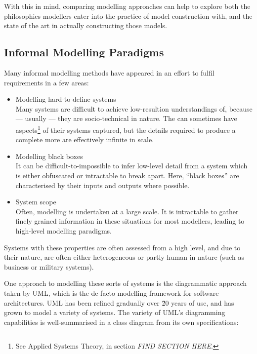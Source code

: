 \documentclass[draft]{report}
\begin{document}
With this in mind, comparing modelling approaches can help to explore both the
philosophies modellers enter into the practice of model construction with, and
the state of the art in actually constructing those models.\par


\subsection{Informal Modelling Paradigms}
\label{subsec:informal_model_lit}
Many informal modelling methods have appeared in an effort to fulfil
requirements in a few areas:

\begin{itemize}
\item Modelling hard-to-define systems\\
  Many systems are difficult to achieve low-resultion understandings of, because
  --- usually --- they are socio-technical in nature. The can sometimes have
  aspects\footnote{See Applied Systems Theory, in section \emph{FIND SECTION
      HERE}.} of their
  systems captured, but the details required to produce a complete more are
  effectively infinite in scale.
\item Modelling black boxes\\
  It can be difficult-to-impossible to infer low-level detail from a system
  which is either obfuscated or intractable to break apart. Here, ``black
  boxes'' are characterised by their inputs and outputs where possible.
\item System scope\\
  Often, modelling is undertaken at a large scale. It is intractable to gather
  finely grained information in these situations for most modellers, leading to
  high-level modelling paradigms.
\end{itemize}

Systems with these properties are often assessed from a high level, and due to
their nature, are often either heterogeneous or partly human in nature (such as
business or military systems).\par

One approach to modelling these sorts of systems is the diagrammatic approach
taken by UML\cite{uml_citations}, which is the de-facto modelling framework for
software architectures. UML has been refined gradually over \~20 years of use,
and has grown to model a variety of systems. The variety of UML's diagramming
capabilities is well-summarised in a class diagram from its own
specifications:\par
\end{document}
